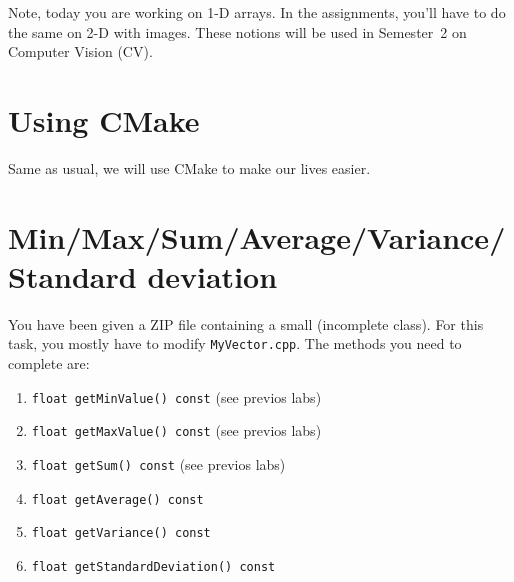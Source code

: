 \documentclass[english,a4paper,12pt,oneside]{article}
\begin{document}
Note, today you are working on 1-D arrays. In the assignments, you'll have to do the same on 2-D with images. 
These notions will be used in Semester~2 on Computer Vision (CV). 

\section{Using CMake}

Same as usual, we will use CMake to make our lives easier. 

\section{Min/Max/Sum/Average/Variance/Standard deviation}

You have been given a ZIP file containing a small (incomplete class). 
For this task, you mostly have to modify \verb+MyVector.cpp+.
The methods you need to complete are:
\begin{enumerate}
 \item \verb+float getMinValue() const+ (see previos labs)
 \item \verb+float getMaxValue() const+ (see previos labs)
 \item \verb+float getSum() const+ (see previos labs)
 \item \verb+float getAverage() const+
 \item \verb+float getVariance() const+
 \item \verb+float getStandardDeviation() const+
\end{enumerate}
\end{document}
